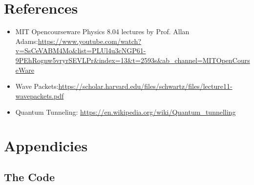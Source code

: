 \documentclass[10pt, a4paper]{article}
\begin{document}
\section{\Large \textbf{References}}
\begin{adjustwidth}{1cm}{}

\begin{itemize}
    \item MIT Opencourseware Physics 8.04 lectures by Prof. Allan Adams:\url{https://www.youtube.com/watch?v=SsCeVABM4Mo&list=PLUl4u3cNGP61-9PEhRognw5vryrSEVLPr&index=13&t=2593s&ab_channel=MITOpenCourseWare}\\
    \item Wave Packets:\url{https://scholar.harvard.edu/files/schwartz/files/lecture11-wavepackets.pdf}\\
    \item Quantum Tunneling: \url{https://en.wikipedia.org/wiki/Quantum_tunnelling}
\end{itemize}
\end{adjustwidth}



\section{\Large \textbf{Appendicies}}
\subsection{The Code}
\end{document}
